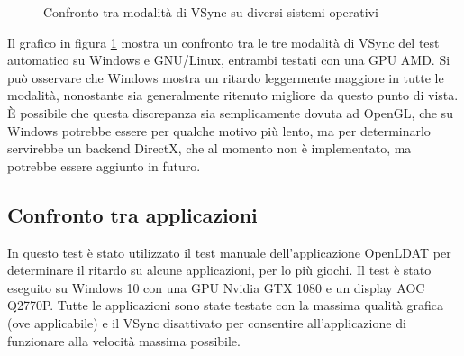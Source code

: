 \begin{figure}[h!]
	\centering
	\dataset
	\caption{Confronto tra modalità di VSync su diversi sistemi operativi}
	\label{fig:inputlag_vsyncmodes}
\end{figure}

Il grafico in figura \ref{fig:inputlag_vsyncmodes} mostra un confronto tra le tre modalità di VSync del test automatico su Windows e GNU/Linux, entrambi testati con una GPU AMD. Si può osservare che Windows mostra un ritardo leggermente maggiore in tutte le modalità, nonostante sia generalmente ritenuto migliore da questo punto di vista. È possibile che questa discrepanza sia semplicamente dovuta ad OpenGL, che su Windows potrebbe essere per qualche motivo più lento, ma per determinarlo servirebbe un backend DirectX, che al momento non è implementato, ma potrebbe essere aggiunto in futuro.

\subsection{Confronto tra applicazioni}
In questo test è stato utilizzato il test manuale dell'applicazione OpenLDAT per determinare il ritardo su alcune applicazioni, per lo più giochi. Il test è stato eseguito su Windows 10 con una GPU Nvidia GTX 1080 e un display AOC Q2770P. Tutte le applicazioni sono state testate con la massima qualità grafica (ove applicabile) e il VSync disattivato per consentire all'applicazione di funzionare alla velocità massima possibile.

